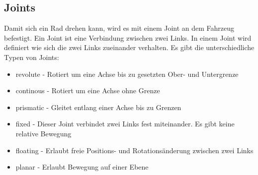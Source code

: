\subsection*{Joints}
Damit sich ein Rad drehen kann, wird es mit einem Joint an dem Fahrzeug befestigt.
Ein Joint ist eine Verbindung zwischen zwei Links. 
In einem Joint wird definiert wie sich die zwei Links zueinander verhalten.
Es gibt die unterschiedliche Typen von Joints:
\begin{itemize}
    \item revolute - Rotiert um eine Achse bis zu gesetzten Ober- und Untergrenze
    \item continous - Rotiert um eine Achse ohne Grenze
    \item prismatic - Gleitet entlang einer Achse bis zu Grenzen
    \item fixed - Dieser Joint verbindet zwei Links fest miteinander. Es gibt keine relative Bewegung
    \item floating - Erlaubt freie Positions- und Rotationsänderung zwischen zwei Links
    \item planar - Erlaubt Bewegung auf einer Ebene
\end{itemize}
\cite{Joint}

